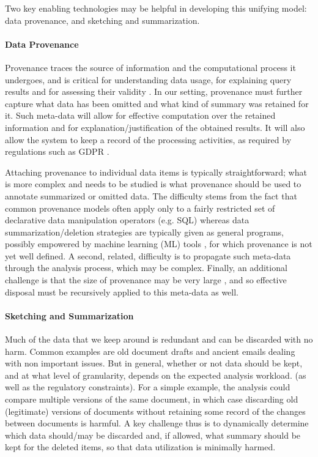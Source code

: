 \documentclass[11pt,dvipdfm]{article}
\begin{document}
Two key enabling technologies may be helpful in developing this unifying model:  data provenance, and sketching and summarization.

\vspace{-2mm}

\paragraph*{Data Provenance}
Provenance traces the source
of information and the computational process it undergoes, and is
critical for understanding data usage, for explaining query results
and for assessing their validity \cite{prov,moreprov}. In our
setting, provenance must further capture what data has been omitted
and what kind of summary was retained for it. Such
meta-data will allow for effective computation over the
retained information and for explanation/justification of the
obtained results. It will also allow the system to keep a record of the processing
activities, as required by regulations such as GDPR \cite{gdpr}.

\newpage
Attaching provenance to individual data items is typically
straightforward; what is more complex and needs to be studied
is what provenance should be used to annotate
summarized or omitted  data. The difficulty stems from the fact that
common provenance models often apply only to a fairly restricted set
of declarative data manipulation operators (e.g. SQL) whereas data
summarization/deletion strategies are typically given as general
programs, possibly empowered by machine learning (ML) tools
\cite{summerization,amnesia}, for which provenance is not yet well
defined. A second, related, difficulty is to propagate such
meta-data through the analysis process, which may be complex.
Finally, an additional challenge is that the size of provenance may be very large \cite{selprov,provesize}, and so effective
disposal must be recursively applied to this meta-data as well.

\vspace{-2mm}

\paragraph*{Sketching and Summarization}
Much of the data that we keep around is redundant and can be
discarded with no harm. 
Common examples are old document drafts and ancient emails dealing with non important issues. 
But in general,
whether or not data should be kept, and at what level of granularity,
depends on the expected analysis workload.
(as well as the regulatory constraints). 
For a simple example, the analysis could compare multiple versions of the same document, in
which case discarding old (legitimate) versions of documents without
retaining some record of the changes between documents is harmful.
A key challenge thus is
to dynamically determine which data should/may be discarded and, if
allowed, what summary should be kept for the deleted items, so that
data utilization is minimally harmed. 
\end{document}
